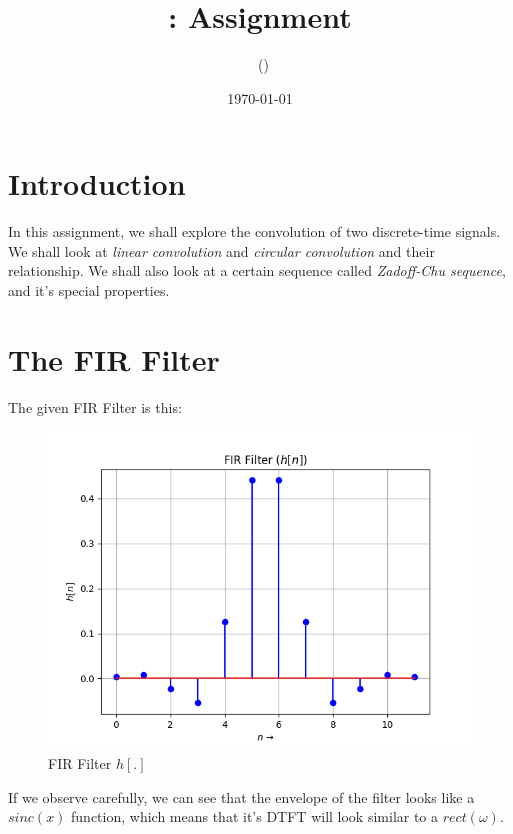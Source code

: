 \documentclass[12pt, a4paper, twoside]{article}
\title{\courseNumber : Assignment \assignmentNumber}
\author{\myName\ (\rollNumber)}
\date{\today}
\begin{document}
\maketitle

\section{Introduction}
In this assignment, we shall explore the convolution of two discrete-time signals. We shall look at \textit{linear convolution} and \textit{circular convolution} and their relationship. We shall also look at a certain sequence called \textit{Zadoff-Chu sequence}, and it's special properties.

\section{The FIR Filter}
The given FIR Filter is this:
\begin{figure}[H]
    \centering
    \includegraphics[scale=0.5]{Fig0.png}
    \caption{FIR Filter $h[.]$}
    \label{fig:Fig0}
\end{figure}
If we observe carefully, we can see that the envelope of the filter looks like a $sinc(x)$ function, which means that it's DTFT will look similar to a $rect(\omega)$. 
\end{document}

